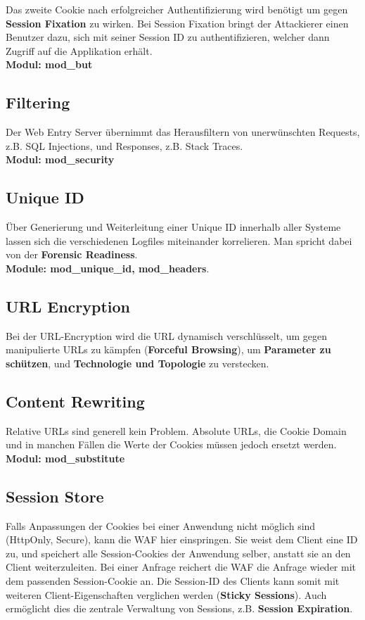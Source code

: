 Das zweite Cookie nach erfolgreicher Authentifizierung wird benötigt um gegen \textbf{Session Fixation} zu wirken. Bei Session Fixation bringt der Attackierer einen Benutzer dazu, sich mit seiner Session ID zu authentifizieren, welcher dann Zugriff auf die Applikation erhält.\\
\textbf{Modul: mod\_but}

\subsection{Filtering}
Der Web Entry Server übernimmt das Herausfiltern von unerwünschten Requests, z.B. SQL Injections, und Responses, z.B. Stack Traces.\\
\textbf{Modul: mod\_security}

\subsection{Unique ID}
Über Generierung und Weiterleitung einer Unique ID innerhalb aller Systeme lassen sich die verschiedenen Logfiles miteinander korrelieren. Man spricht dabei von der \textbf{Forensic Readiness}.\\
\textbf{Module: mod\_unique\_id, mod\_headers}.

\subsection{URL Encryption}
Bei der URL-Encryption wird die URL dynamisch verschlüsselt, um gegen manipulierte URLs zu kämpfen (\textbf{Forceful Browsing}), um \textbf{Parameter zu schützen}, und \textbf{Technologie und Topologie} zu verstecken.

\subsection{Content Rewriting}
Relative URLs sind generell kein Problem. Absolute URLs, die Cookie Domain und in manchen Fällen die Werte der Cookies müssen jedoch ersetzt werden.\\
\textbf{Modul: mod\_substitute}

\subsection{Session Store}
Falls Anpassungen der Cookies bei einer Anwendung nicht möglich sind (HttpOnly, Secure), kann die WAF hier einspringen. Sie weist dem Client eine ID zu, und speichert alle Session-Cookies der Anwendung selber, anstatt sie an den Client weiterzuleiten. Bei einer Anfrage reichert die WAF die Anfrage wieder mit dem passenden Session-Cookie an. Die Session-ID des Clients kann somit mit weiteren Client-Eigenschaften verglichen werden (\textbf{Sticky Sessions}). Auch ermöglicht dies die zentrale Verwaltung von Sessions, z.B. \textbf{Session Expiration}.